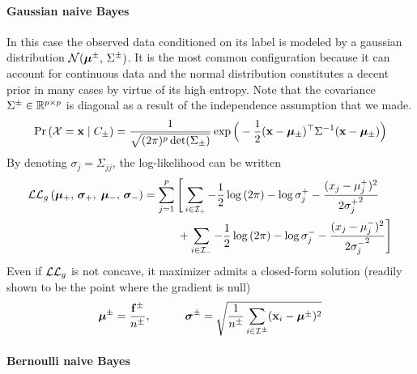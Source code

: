 \paragraph{Gaussian naive Bayes}\label{subsubsec:gnb}

In this case the observed data conditioned on its label is modeled by a gaussian distribution
$\mathcal{N}( \bm{\mu}^\pm,\, \Sigma^\pm )$.
It is the most common configuration because it can account for continuous data and the normal distribution constitutes
a decent prior in many cases by virtue of its high entropy.
Note that the covariance $\Sigma^\pm \in \mathbb{R}^{p \times p}$
is diagonal as a result of the independence assumption that we made.
\begin{equation*}
    \Pr\left( \mathcal{X} = \mathbf{x} \mid C_\pm \right) =
    \frac{1}{\sqrt{(2\pi)^p\det(\Sigma_\pm)}}
    \exp\Big( -\frac{1}{2}(\mathbf{x} - \bm{\mu}_\pm)^\top\Sigma^{-1}(\mathbf{x} - \bm{\mu}_\pm) \Big)
\end{equation*}
By denoting $\sigma_j = \Sigma_{j j}$, the log-likelihood can be written
\begin{equation*}
    \begin{split}
        \mathcal{L}\mathcal{L}_g\left( \bm{\mu}_+,\, \bm{\sigma}_+,\; \bm{\mu}_-,\, \bm{\sigma}_-\right ) &=
        \sum_{j = 1}^p \Bigg[
            \sum_{i \in \mathcal{I}_+}
                -\frac{1}{2} \log \left( 2\pi \right)
                -\log \sigma_j^+
                -\frac{(x_j - \mu^+_j)^2}{2{\sigma^+_j}^2}\\
            &\qquad\quad+ \sum_{i \in \mathcal{I}_-}
                -\frac{1}{2} \log \left( 2\pi \right)
                -\log \sigma_j^-
                -\frac{(x_j - \mu^-_j)^2}{2{\sigma^-_j}^2}
        \Bigg]
    \end{split}
\end{equation*}
Even if $\mathcal{L}\mathcal{L}_g$ is not concave, it maximizer admits a closed-form solution
(readily shown to be the point where the gradient is null)
\begin{align*}
    \bm{\mu}^\pm = \frac{\mathbf{f}^\pm}{n^\pm}
    ,\qquad\quad
    \bm{\sigma}^\pm = \sqrt{\frac{1}{n^\pm} \sum_{i \in \mathcal{I}^\pm} (\mathbf{x}_i - \bm{\mu}^\pm)^2}
\end{align*}

\paragraph{Bernoulli naive Bayes}\label{subsubsec:bnb}

